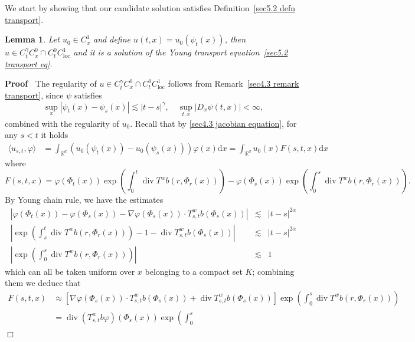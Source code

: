 \documentclass[10pt]{article}
\newcommand{\mathd}{\mathrm{d}}
\newcommand{\tmop}[1]{\ensuremath{\operatorname{#1}}}
\newenvironment{proof}{\noindent\textbf{Proof\ }}{\hspace*{\fill}$\Box$\medskip}
\newtheorem{lemma}{Lemma}
\begin{document}
We start by showing that our candidate solution satisfies
Definition~\ref{sec5.2 defn transport}.

\begin{lemma}
  \label{sec5.2 lemma existence transport}Let $u_0 \in C^1_x$ and define $u
  (t, x) = u_0 (\psi_t (x))$, then $u \in C^{\gamma}_t C^0_x \cap C^0_t
  C^1_{\tmop{loc}}$ and it is a solution of the Young transport
  equation~{\eqref{sec5.2 transport eq}}.
\end{lemma}

\begin{proof}
  The regularity of $u \in C^{\gamma}_t C^0_x \cap C^0_t C^1_{\tmop{loc}}$
  follows from Remark~\ref{sec4.3 remark transport}, since $\psi$ satisfies
  \[ \sup_x | \psi_t (x) - \psi_s (x) | \lesssim | t - s |^{\gamma}, \quad
     \sup_{t, x} | D_x \psi (t, x) | < \infty, \]
  combined with the regularity of $u_0$. Recall that by {\eqref{sec4.3
  jacobian equation}}, for any $s < t$ it holds
%  
  \begin{align*}
    \langle u_{s, t}, \varphi \rangle & = \int_{\mathbb{R}^d} (u_0 (\psi_t
    (x)) - u_0 (\psi_s (x))) \varphi (x) \mathd x = \int_{\mathbb{R}^d} u_0
    (x) F (s, t, x) \mathd x
  \end{align*}
%  
  where
  \[ F (s, t, x) = \varphi (\Phi_t (x)) \exp \left( \int_0^t \tmop{div} T^w b
     (r, \Phi_r (x)) \right) - \varphi (\Phi_s (x)) \exp \left( \int_0^s
     \tmop{div} T^w b (r, \Phi_r (x)) \right) . \]
  By Young chain rule, we have the estimates
  \begin{eqnarray*}
    | \varphi (\Phi_t (x)) - \varphi (\Phi_s (x)) - \nabla \varphi (\Phi_s
    (x)) \cdot T^w_{s, t} b (\Phi_s (x)) | & \lesssim & | t - s |^{2 \alpha}\\
    \left| \exp \left( \int_s^t \tmop{div} T^w b (r, \Phi_r (x)) \right) - 1 -
    \tmop{div} T^w_{s, t} b (\Phi_s (x)) \right| & \lesssim & | t - s |^{2
    \alpha}\\
    \left| \exp \left( \int_0^s \tmop{div} T^w b (r, \Phi_r (x)) \right)
    \right| & \lesssim & 1
  \end{eqnarray*}
  which can all be taken uniform over $x$ belonging to a compact set $K$;
  combining them we deduce that
%  
  \begin{align*}
    F (s, t, x) & \approx [\nabla \varphi (\Phi_s (x)) \cdot T^w_{s, t} b
    (\Phi_s (x)) + \tmop{div} T^w_{s, t} b (\Phi_s (x))] \exp \left( \int_0^s
    \tmop{div} T^w b (r, \Phi_r (x)) \right)\\
    & = \tmop{div} (T^w_{s, t} b \varphi) (\Phi_s (x)) \exp \left( \int_0^s

\end{align*}
\end{proof}
\end{document}
